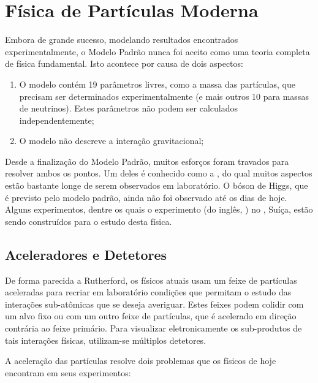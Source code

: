 \section{Física de Partículas Moderna}

Embora de grande sucesso, modelando resultados encontrados
ex\-pe\-ri\-men\-tal\-men\-te, o Modelo Pa\-drão nunca foi aceito como uma
teoria completa de física fundamental. Isto acontece por causa de dois
aspectos:

\begin{enumerate}
\item O modelo contém 19 parâmetros livres, como a massa das partículas, que
  precisam ser determinados experimentalmente (e mais outros 10 para massas de
  neutrinos). Estes parâmetros não podem ser calculados independentemente;

\item O modelo não descreve a interação gravitacional;
\end{enumerate}

Desde a finalização do Modelo Padrão, muitos esforços foram travados para
resolver ambos os pontos. Um deles é conhecido como a ,
do qual muitos aspectos estão bastante longe de serem observados em
laboratório. O bóson de Higgs, que é previsto pelo
modelo padrão, ainda não foi observado até os dias de hoje. Alguns
experimentos, dentre os quais o experimento  (do inglês, ) no , Suíça, estão sendo construídos para o
estudo desta física.

\subsection{Aceleradores e Detetores}

De forma parecida a Rutherford, os físicos atuais usam um feixe de partículas
aceleradas para recriar em laboratório condições que permitam o estudo das
interações sub-atômicas que se deseja averiguar. Estes feixes podem colidir com
um alvo fixo ou com um outro feixe de partículas, que é acelerado em direção
contrária ao feixe primário. Para visualizar eletronicamente os sub-produtos
de tais interações físicas, utilizam-se múltiplos detetores.

A aceleração das partículas resolve dois problemas que os físicos de hoje
encontram em seus experimentos:

